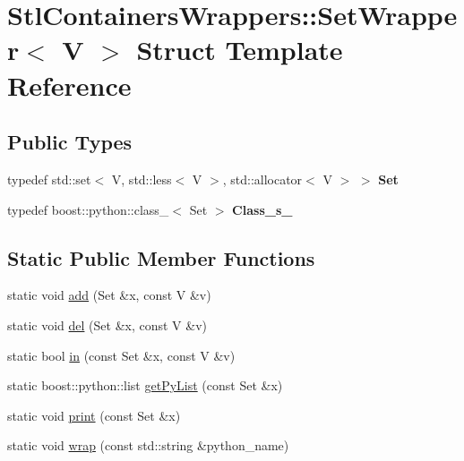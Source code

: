 \hypertarget{struct_stl_containers_wrappers_1_1_set_wrapper}{
\section{StlContainersWrappers::SetWrapper$<$ V $>$ Struct Template Reference}
\label{struct_stl_containers_wrappers_1_1_set_wrapper}
}
\subsection*{Public Types}
\begin{DoxyCompactItemize}
\item 
\hypertarget{struct_stl_containers_wrappers_1_1_set_wrapper_af95d8b464c01116c734f90435bc5a7de}{
typedef std::set$<$ V, std::less$<$ V $>$, std::allocator$<$ V $>$ $>$ {\bfseries Set}}
\label{struct_stl_containers_wrappers_1_1_set_wrapper_af95d8b464c01116c734f90435bc5a7de}

\item 
\hypertarget{struct_stl_containers_wrappers_1_1_set_wrapper_a5af63f3f2e6e31f8f3df7bf83657a935}{
typedef boost::python::class\_\-$<$ Set $>$ {\bfseries Class\_\-s\_\-}}
\label{struct_stl_containers_wrappers_1_1_set_wrapper_a5af63f3f2e6e31f8f3df7bf83657a935}

\end{DoxyCompactItemize}
\subsection*{Static Public Member Functions}
\begin{DoxyCompactItemize}
\item 
static void \hyperlink{struct_stl_containers_wrappers_1_1_set_wrapper_a5aa10d43c949ab14dce86ada294a517f}{add} (Set \&x, const V \&v)
\item 
static void \hyperlink{struct_stl_containers_wrappers_1_1_set_wrapper_ace89534d1947475d9df652cc028d21ff}{del} (Set \&x, const V \&v)
\item 
static bool \hyperlink{struct_stl_containers_wrappers_1_1_set_wrapper_a1962f5a329a40cb328e60971ee99e0be}{in} (const Set \&x, const V \&v)
\item 
static boost::python::list \hyperlink{struct_stl_containers_wrappers_1_1_set_wrapper_a1beec5bd4543b5f175ae95877a1844b8}{getPyList} (const Set \&x)
\item 
static void \hyperlink{struct_stl_containers_wrappers_1_1_set_wrapper_a3f90e1e6b44e90abe44c63c3f323c93c}{print} (const Set \&x)
\item 
static void \hyperlink{struct_stl_containers_wrappers_1_1_set_wrapper_aec5cc7bb0b7c14f8196571c5fd81d137}{wrap} (const std::string \&python\_\-name)
\end{DoxyCompactItemize}
